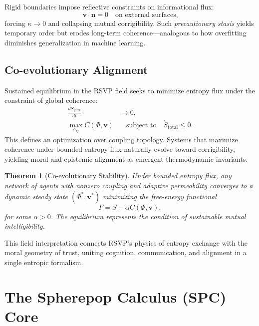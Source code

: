 \documentclass[12pt]{article}
\newtheorem{theorem}{Theorem}
\begin{document}
Rigid boundaries impose reflective constraints on informational flux:
\begin{equation}
\mathbf{v}\cdot \mathbf{n} = 0 \quad \text{on external surfaces,}
\end{equation}
forcing \(\kappa\to0\) and collapsing mutual corrigibility. Such \emph{precautionary stasis} yields temporary order but erodes long-term coherence—analogous to how overfitting diminishes generalization in machine learning.

\subsection*{Co-evolutionary Alignment}

Sustained equilibrium in the RSVP field seeks to minimize entropy flux under the constraint of global coherence:
\begin{align}
\frac{dS_{\text{joint}}}{dt} &\to 0,\\[4pt]
\max_{\kappa_{ij}} C(\Phi,\mathbf{v}) &\quad \text{subject to} \quad \dot S_{\text{total}} \le 0.
\end{align}
This defines an optimization over coupling topology. Systems that maximize coherence under bounded entropy flux naturally evolve toward corrigibility, yielding moral and epistemic alignment as emergent thermodynamic invariants.

\begin{theorem}[Co-evolutionary Stability]
Under bounded entropy flux, any network of agents with nonzero coupling and adaptive permeability converges to a dynamic steady state \((\Phi^\ast, \mathbf{v}^\ast)\) minimizing the free-energy functional
\[
F = S - \alpha C(\Phi,\mathbf{v}),
\]
for some $\alpha>0$. The equilibrium represents the condition of sustainable mutual intelligibility.
\end{theorem}

\vspace{1em}
\noindent
This field interpretation connects RSVP’s physics of entropy exchange with the moral geometry of trust, uniting cognition, communication, and alignment in a single entropic formalism.

\section{The Spherepop Calculus (SPC) Core}
\end{document}
